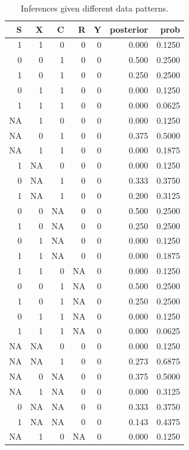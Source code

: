 \documentclass[12pt,]{book}
\begin{document}
\begin{table}[t]

\caption{\label{tab:showstrats5xx}Inferences given different data patterns. }
\centering
\begin{tabular}{r|r|r|r|r|r|r}
\hline
S & X & C & R & Y & posterior & prob\\
\hline
1 & 1 & 0 & 0 & 0 & 0.000 & 0.1250\\
\hline
0 & 0 & 1 & 0 & 0 & 0.500 & 0.2500\\
\hline
1 & 0 & 1 & 0 & 0 & 0.250 & 0.2500\\
\hline
0 & 1 & 1 & 0 & 0 & 0.000 & 0.1250\\
\hline
1 & 1 & 1 & 0 & 0 & 0.000 & 0.0625\\
\hline
NA & 1 & 0 & 0 & 0 & 0.000 & 0.1250\\
\hline
NA & 0 & 1 & 0 & 0 & 0.375 & 0.5000\\
\hline
NA & 1 & 1 & 0 & 0 & 0.000 & 0.1875\\
\hline
1 & NA & 0 & 0 & 0 & 0.000 & 0.1250\\
\hline
0 & NA & 1 & 0 & 0 & 0.333 & 0.3750\\
\hline
1 & NA & 1 & 0 & 0 & 0.200 & 0.3125\\
\hline
0 & 0 & NA & 0 & 0 & 0.500 & 0.2500\\
\hline
1 & 0 & NA & 0 & 0 & 0.250 & 0.2500\\
\hline
0 & 1 & NA & 0 & 0 & 0.000 & 0.1250\\
\hline
1 & 1 & NA & 0 & 0 & 0.000 & 0.1875\\
\hline
1 & 1 & 0 & NA & 0 & 0.000 & 0.1250\\
\hline
0 & 0 & 1 & NA & 0 & 0.500 & 0.2500\\
\hline
1 & 0 & 1 & NA & 0 & 0.250 & 0.2500\\
\hline
0 & 1 & 1 & NA & 0 & 0.000 & 0.1250\\
\hline
1 & 1 & 1 & NA & 0 & 0.000 & 0.0625\\
\hline
NA & NA & 0 & 0 & 0 & 0.000 & 0.1250\\
\hline
NA & NA & 1 & 0 & 0 & 0.273 & 0.6875\\
\hline
NA & 0 & NA & 0 & 0 & 0.375 & 0.5000\\
\hline
NA & 1 & NA & 0 & 0 & 0.000 & 0.3125\\
\hline
0 & NA & NA & 0 & 0 & 0.333 & 0.3750\\
\hline
1 & NA & NA & 0 & 0 & 0.143 & 0.4375\\
\hline
NA & 1 & 0 & NA & 0 & 0.000 & 0.1250\\

\end{tabular}
\end{table}
\end{document}
